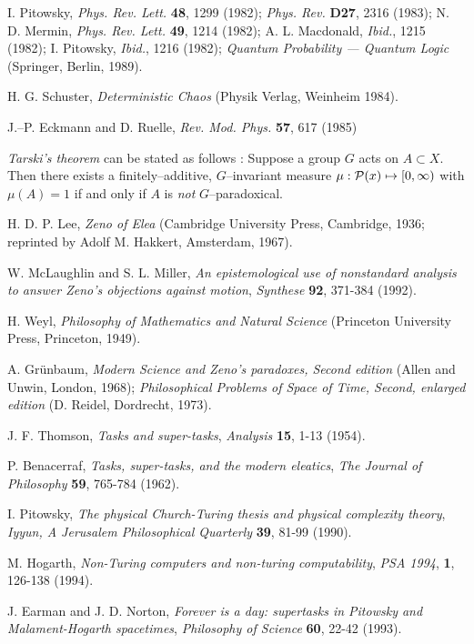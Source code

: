 \begin{thebibliography}{99}
 I. Pitowsky, {\sl Phys.
 Rev. Lett.} {\bf 48}, 1299 (1982); {\sl Phys. Rev.} {\bf D27}, 2316
 (1983); N. D. Mermin, {\sl Phys. Rev. Lett.}
 {\bf 49}, 1214 (1982); A. L. Macdonald, {\it Ibid.}, 1215 (1982); I.
 Pitowsky, {\it Ibid.}, 1216 (1982);
 {\sl Quantum Probability --- Quantum Logic} (Springer,
 Berlin, 1989).

H. G. Schuster,
{\sl Deterministic Chaos}
(Physik Verlag, Weinheim 1984).

J.--P. Eckmann and D. Ruelle,
{\sl Rev. Mod. Phys.} {\bf 57}, 617 (1985)


{\sl Tarski's theorem} can be stated as follows \cite{wagon1}:
Suppose a group $G$ acts on $A\subset X$.
Then there exists a finitely--additive, $G$--invariant
measure $\mu :{\cal P}(x)\mapsto [0,\infty )$ with $\mu (A)=1$ if and
only if $A$ is {\em not} $G$--paradoxical.

 H. D. P. Lee, {\sl Zeno of Elea} (Cambridge University Press,
 Cambridge, 1936; reprinted by Adolf M. Hakkert, Amsterdam, 1967).

W. McLaughlin and S. L. Miller, {\it An epistemological use of
nonstandard analysis to answer Zeno's objections against motion},
{\sl Synthese} {\bf 92}, 371-384 (1992).

H. Weyl,
{\sl Philosophy of Mathematics and Natural Science}
(Princeton University Press, Princeton, 1949).

A. Gr\"unbaum,
{\sl Modern Science and Zeno's paradoxes, Second edition}
(Allen and Unwin, London, 1968);
{\sl Philosophical Problems of Space of Time, Second, enlarged edition}
(D. Reidel, Dordrecht, 1973).

J. F. Thomson, {\sl Tasks and super-tasks},
{\sl Analysis} {\bf 15}, 1-13 (1954).

P. Benacerraf, {\sl Tasks, super-tasks, and the modern eleatics},
{\sl The Journal of Philosophy} {\bf 59}, 765-784 (1962).

I. Pitowsky,
{\sl The physical Church-Turing thesis and physical complexity theory},
{\sl Iyyun, A Jerusalem Philosophical Quarterly} {\bf 39}, 81-99 (1990).


M. Hogarth,
{\sl Non-Turing computers and non-turing computability},
{\sl PSA 1994}, {\bf 1}, 126-138 (1994).

J. Earman and J. D. Norton,
{\sl Forever is a day: supertasks in Pitowsky and Malament-Hogarth
spacetimes},
{\sl Philosophy of Science} {\bf 60}, 22-42 (1993).



\end{thebibliography}

